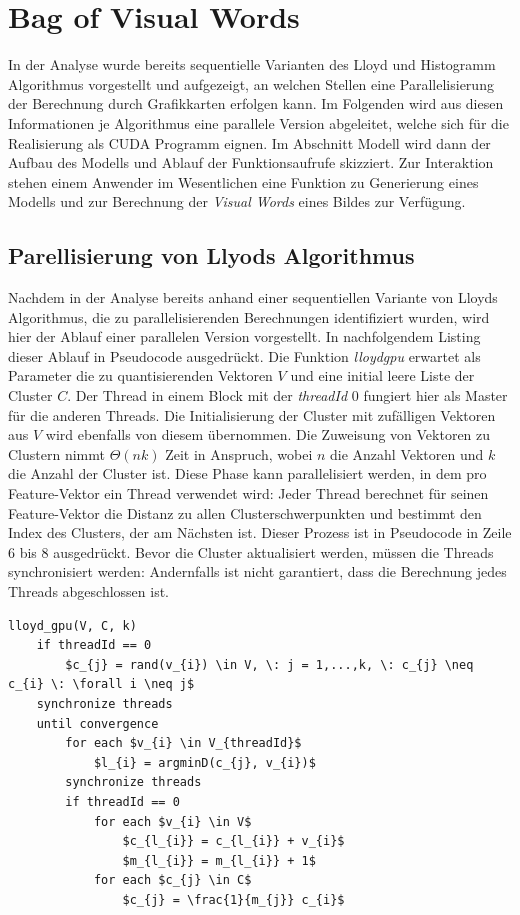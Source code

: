 \section{Bag of Visual Words}

In der Analyse wurde bereits sequentielle Varianten des Lloyd und Histogramm Algorithmus vorgestellt und aufgezeigt, an welchen Stellen eine Parallelisierung der Berechnung durch Grafikkarten erfolgen kann. Im Folgenden wird aus diesen Informationen je Algorithmus eine parallele Version abgeleitet, welche sich für die Realisierung als CUDA Programm eignen.
Im Abschnitt Modell wird dann der Aufbau des Modells und Ablauf der Funktionsaufrufe skizziert. Zur Interaktion stehen einem Anwender im Wesentlichen eine Funktion zu Generierung eines Modells und zur Berechnung der \textit{Visual Words} eines Bildes zur Verfügung.

\subsection{Parellisierung von Llyods Algorithmus}

Nachdem in der Analyse bereits anhand einer sequentiellen Variante von Lloyds Algorithmus, die zu parallelisierenden Berechnungen identifiziert wurden, wird hier der Ablauf einer parallelen Version vorgestellt. In nachfolgendem Listing dieser Ablauf in Pseudocode ausgedrückt. Die Funktion \textit{lloyd\textunderscore gpu} erwartet als Parameter die zu quantisierenden Vektoren $V$ und eine initial leere Liste der Cluster $C$. Der Thread in einem Block mit der \textit{threadId} 0 fungiert hier als Master für die anderen Threads. Die Initialisierung der Cluster mit zufälligen Vektoren aus $V$ wird ebenfalls von diesem übernommen. Die Zuweisung von Vektoren zu Clustern nimmt $\Theta(nk)$ Zeit in Anspruch, wobei $n$ die Anzahl Vektoren und $k$ die Anzahl der Cluster ist. Diese Phase kann parallelisiert werden, in dem pro Feature-Vektor ein Thread verwendet wird: Jeder Thread berechnet für seinen Feature-Vektor die Distanz zu allen Clusterschwerpunkten und bestimmt den Index des Clusters, der am Nächsten ist. Dieser Prozess ist in Pseudocode in Zeile 6 bis 8 ausgedrückt. Bevor die Cluster aktualisiert werden, müssen die Threads synchronisiert werden: Andernfalls ist nicht garantiert, dass die Berechnung jedes Threads abgeschlossen ist.

\lstset{language=C}
\begin{lstlisting}[mathescape=true]
lloyd_gpu(V, C, k)
	if threadId == 0
		$c_{j} = rand(v_{i}) \in V, \: j = 1,...,k, \: c_{j} \neq c_{i} \: \forall i \neq j$
	synchronize threads
	until convergence
		for each $v_{i} \in V_{threadId}$
			$l_{i} = argminD(c_{j}, v_{i})$
		synchronize threads
		if threadId == 0
			for each $v_{i} \in V$
				$c_{l_{i}} = c_{l_{i}} + v_{i}$
				$m_{l_{i}} = m_{l_{i}} + 1$
			for each $c_{j} \in C$
				$c_{j} = \frac{1}{m_{j}} c_{i}$
\end{lstlisting}


